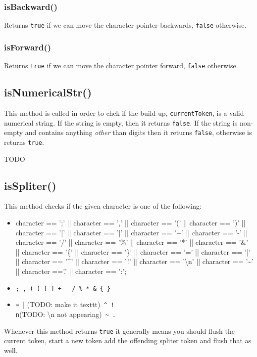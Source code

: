 \subsubsection{isBackward()}

Returns \texttt{true} if we can move the character pointer backwards,
\texttt{false} otherwise.

\subsubsection{isForward()}

Returns \texttt{true} if we can move the character pointer forward,
\texttt{false} otherwise.

\subsection{isNumericalStr()}

This method is called in order to chck if the build up, \texttt{currentToken},
is a valid numerical string. If the string is empty, then it returns
\texttt{false}. If the string is non-empty and contains anything
\emph{other }than digits then it returns \texttt{false}, otherwise
is returns \texttt{true}.

TODO

\subsection{isSpliter()}

This method checks if the given character is one of the following:
\begin{itemize}
\item character == ';' || character == ',' || character == '(' || character
== ')' || character == '{[}' || character == '{]}' || character ==
'+' || character == '-' || character == '/' || character == '\%' ||
character == '{*}' || character == '\&' || character == '\{' || character
== '\}' || character == '=' || character == '|' || character == '\textasciicircum '
|| character == '!' || character == '\textbackslash n' || character
== '\textasciitilde ' || character =='.' || character == ':'; 
\item \texttt{;}~\texttt{,}~\texttt{(}~\texttt{)}~\texttt{[}~\texttt{]}~\texttt{+}~\texttt{-}~\texttt{/}~\texttt{\%}~\texttt{*}~\texttt{\&}~\texttt{\{}~\texttt{\}}
\item \texttt{=}~| (TODO: make it texttt)~\texttt{\^}~\texttt{!}~\texttt{\\n}(TODO:
\textbackslash n not appearing)~\texttt{\~}~\texttt{.}~\texttt{\:}
\end{itemize}
Whenever this method returns \texttt{true} it generally means you
should flush the current token, start a new token add the offending
spliter token and flush that as well.
